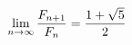 \documentclass[preview]{standalone}
\begin{document}
\begin{align*}
\special{dvisvgm:raw <g id='unique000'>}\lim_{n\to\infty}\frac{F_{n+1}}{F_n}=\frac{1+\sqrt5}{2}\special{dvisvgm:raw </g>}
\end{align*}
\end{document}
